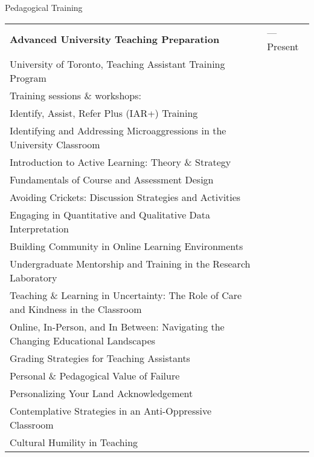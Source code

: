 \documentclass[letterpaper,11pt,oneside]{article}
\begin{document}
 \bigskip





\noindent\Large{Pedagogical Training}
\normalsize
\bigskip

\def\arraystretch{1.1}
\noindent \begin{longtable}{@{} >{\raggedright\arraybackslash}p{15.5cm} >{\raggedright\arraybackslash}p{1.7cm}}

 \textbf{Advanced University Teaching Preparation}  & 2021---Present\\
University of Toronto, Teaching Assistant Training Program \\
Training sessions \& workshops: & \\
  \hspace{5mm} Identify, Assist, Refer Plus (IAR+) Training & \\
  \hspace{5mm} Identifying and Addressing Microaggressions in the University Classroom & \\
  \hspace{5mm} Introduction to Active Learning: Theory \& Strategy & \\
  \hspace{5mm} Fundamentals of Course and Assessment Design & \\
  \hspace{5mm} Avoiding Crickets: Discussion Strategies and Activities & \\
  \hspace{5mm} Engaging in Quantitative and Qualitative Data Interpretation & \\
  \hspace{5mm} Building Community in Online Learning Environments & \\
  \hspace{5mm} Undergraduate Mentorship and Training in the Research Laboratory & \\
  \hspace{5mm} Teaching \& Learning in Uncertainty: The Role of Care and Kindness in the Classroom & \\
  \hspace{5mm} Online, In-Person, and In Between: Navigating the Changing Educational Landscapes & \\
  \hspace{5mm} Grading Strategies for Teaching Assistants & \\
  \hspace{5mm} Personal \& Pedagogical Value of Failure & \\
  \hspace{5mm} Personalizing Your Land Acknowledgement & \\
  \hspace{5mm} Contemplative Strategies in an Anti-Oppressive Classroom & \\
   \hspace{5mm} Cultural Humility in Teaching & \\
\end{longtable}
\end{document}
